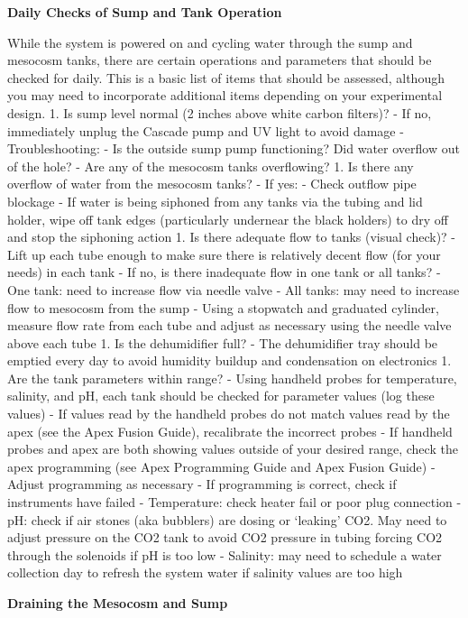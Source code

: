 \documentclass[
]{book}
\begin{document}
\textbf{Daily Checks of Sump and Tank Operation}

While the system is powered on and cycling water through the sump and mesocosm tanks, there are certain operations and parameters that should be checked for daily. This is a basic list of items that should be assessed, although you may need to incorporate additional items depending on your experimental design.
1. Is sump level normal (2 inches above white carbon filters)?
- If no, immediately unplug the Cascade pump and UV light to avoid damage
- Troubleshooting:
- Is the outside sump pump functioning? Did water overflow out of the hole?
- Are any of the mesocosm tanks overflowing?
1. Is there any overflow of water from the mesocosm tanks?
- If yes:
- Check outflow pipe blockage
- If water is being siphoned from any tanks via the tubing and lid holder, wipe off tank edges (particularly undernear the black holders) to dry off and stop the siphoning action
1. Is there adequate flow to tanks (visual check)?
- Lift up each tube enough to make sure there is relatively decent flow (for your needs) in each tank
- If no, is there inadequate flow in one tank or all tanks?
- One tank: need to increase flow via needle valve
- All tanks: may need to increase flow to mesocosm from the sump
- Using a stopwatch and graduated cylinder, measure flow rate from each tube and adjust as necessary using the needle valve above each tube
1. Is the dehumidifier full?
- The dehumidifier tray should be emptied every day to avoid humidity buildup and condensation on electronics
1. Are the tank parameters within range?
- Using handheld probes for temperature, salinity, and pH, each tank should be checked for parameter values (log these values)
- If values read by the handheld probes do not match values read by the apex (see the Apex Fusion Guide), recalibrate the incorrect probes
- If handheld probes and apex are both showing values outside of your desired range, check the apex programming (see Apex Programming Guide and Apex Fusion Guide)
- Adjust programming as necessary
- If programming is correct, check if instruments have failed
- Temperature: check heater fail or poor plug connection
- pH: check if air stones (aka bubblers) are dosing or `leaking' CO2. May need to adjust pressure on the CO2 tank to avoid CO2 pressure in tubing forcing CO2 through the solenoids if pH is too low
- Salinity: may need to schedule a water collection day to refresh the system water if salinity values are too high

\textbf{Draining the Mesocosm and Sump}
\end{document}
